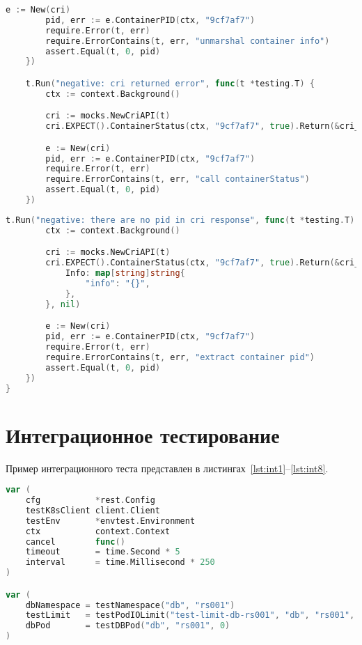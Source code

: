 \begin{appendices}
\begin{lstlisting}[language=Go,label=lst:unit2, caption={Модульный тест (продолжение листинга~\ref{lst:unit1})}]
		e := New(cri)
		pid, err := e.ContainerPID(ctx, "9cf7af7")
		require.Error(t, err)
		require.ErrorContains(t, err, "unmarshal container info")
		assert.Equal(t, 0, pid)
	})

	t.Run("negative: cri returned error", func(t *testing.T) {
		ctx := context.Background()

		cri := mocks.NewCriAPI(t)
		cri.EXPECT().ContainerStatus(ctx, "9cf7af7", true).Return(&cri_api.ContainerStatusResponse{}, errors.New("some error"))

		e := New(cri)
		pid, err := e.ContainerPID(ctx, "9cf7af7")
		require.Error(t, err)
		require.ErrorContains(t, err, "call containerStatus")
		assert.Equal(t, 0, pid)
	})

\end{lstlisting}

\newpage

\begin{lstlisting}[language=Go,label=lst:unit3, caption={Модульный тест (продолжение листинга~\ref{lst:unit2})}]
	t.Run("negative: there are no pid in cri response", func(t *testing.T) {
		ctx := context.Background()

		cri := mocks.NewCriAPI(t)
		cri.EXPECT().ContainerStatus(ctx, "9cf7af7", true).Return(&cri_api.ContainerStatusResponse{
			Info: map[string]string{
				"info": "{}",
			},
		}, nil)

		e := New(cri)
		pid, err := e.ContainerPID(ctx, "9cf7af7")
		require.Error(t, err)
		require.ErrorContains(t, err, "extract container pid")
		assert.Equal(t, 0, pid)
	})
}
\end{lstlisting}



	\chapter{Интеграционное тестирование}
	
	Пример интеграционного теста представлен в листингах~\ref{lst:int1}--\ref{lst:int8}.

\begin{lstlisting}[language=Go,label=lst:int1, caption={Интеграционный тест}]
var (
	cfg           *rest.Config
	testK8sClient client.Client
	testEnv       *envtest.Environment
	ctx           context.Context
	cancel        func()
	timeout       = time.Second * 5
	interval      = time.Millisecond * 250
)

var (
	dbNamespace = testNamespace("db", "rs001")
	testLimit   = testPodIOLimit("test-limit-db-rs001", "db", "rs001", 0)
	dbPod       = testDBPod("db", "rs001", 0)
)


\end{lstlisting}
\end{appendices}

